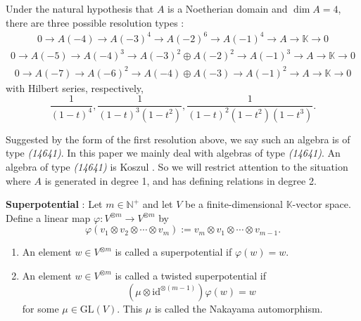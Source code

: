 \documentclass{amsart}
\begin{document}
Under the natural hypothesis that $A$ is a Noetherian domain and $
\dim A = 4$, there are three possible resolution types  \cite[Prop.~1.4]{Lu_2007}:
\begin{align*}\label{eq:type3}
0 \rightarrow A(-4) \rightarrow A(-3)^4 \rightarrow A(-2)^6 \rightarrow A(-1)^4 \rightarrow A \rightarrow \mathbb{K} \rightarrow 0
\end{align*}
\begin{align*}
0 \rightarrow A(-5) \rightarrow A(-4)^3 \rightarrow A(-3)^2 \oplus A(-2)^2 \rightarrow A(-1)^3 \rightarrow A \rightarrow \mathbb{K} \rightarrow 0   
\end{align*}
\begin{align*}
0 \rightarrow A(-7) \rightarrow A(-6)^2 \rightarrow A(-4) \oplus A(-3) \rightarrow A(-1)^2 \rightarrow A \rightarrow \mathbb{K} \rightarrow 0    
\end{align*}
with Hilbert series, respectively, 
$$ \frac{1}{(1 - t)^4}, \frac{1}{(1 - t)^3 (1 - t^2)}, \frac{1}{(1 - t)^2 (1 - t^2) (1 - t^3)}.$$

Suggested by the form of the first resolution above, we say such an algebra is of type \textit{(14641)}. In this paper we mainly deal with algebras of type \textit{(14641)}. An algebra of type \textit{(14641)} is Koszul \cite[Theorem 0.1]{MR2529094}. So we will restrict attention to the situation where $A$ is generated in degree 1, and has defining relations in degree 2. 

\begin{definition}\label{def:superpotential}
\textbf{Superpotential} \cite[Definition 2.5]{Mori_Izuru_Smith}:
Let $m \in \mathbb{N}^+$ and let $V$ be a finite-dimensional $\mathbb{K}$-vector space.  
Define a linear map $\varphi : V^{\otimes m} \to V^{\otimes m}$ by  
\[
\varphi(v_1 \otimes v_2 \otimes \cdots \otimes v_{m}) := v_m \otimes v_1 \otimes \cdots \otimes v_{m-1}.
\]
\begin{enumerate}
    \item An element $w \in V^{\otimes m}$ is called a superpotential if $\varphi(w) = w$.
    
    \item An element $w \in V^{\otimes m}$ is called a twisted superpotential if 
    \[
    (\mu \otimes \mathrm{id}^{\otimes (m-1)})\varphi(w) = w
    \]
    for some $\mu \in \mathrm{GL}(V)$. This $\mu$ is called the Nakayama automorphism.
\end{enumerate}  
\end{definition}
\end{document}
